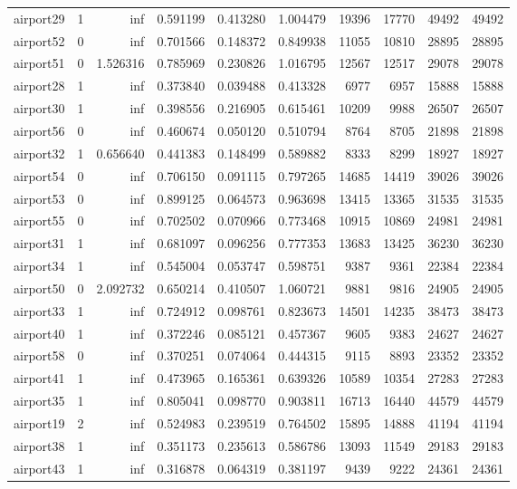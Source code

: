\begin{longtable}{|l|r|r|r|r|r|r|r|r|r|}
airport29 & 1 & inf & 0.591199 & 0.413280 & 1.004479 & 19396 & 17770 & 49492 & 49492 \\
airport52 & 0 & inf & 0.701566 & 0.148372 & 0.849938 & 11055 & 10810 & 28895 & 28895 \\
airport51 & 0 & 1.526316 & 0.785969 & 0.230826 & 1.016795 & 12567 & 12517 & 29078 & 29078 \\
airport28 & 1 & inf & 0.373840 & 0.039488 & 0.413328 & 6977 & 6957 & 15888 & 15888 \\
airport30 & 1 & inf & 0.398556 & 0.216905 & 0.615461 & 10209 & 9988 & 26507 & 26507 \\
airport56 & 0 & inf & 0.460674 & 0.050120 & 0.510794 & 8764 & 8705 & 21898 & 21898 \\
airport32 & 1 & 0.656640 & 0.441383 & 0.148499 & 0.589882 & 8333 & 8299 & 18927 & 18927 \\
airport54 & 0 & inf & 0.706150 & 0.091115 & 0.797265 & 14685 & 14419 & 39026 & 39026 \\
airport53 & 0 & inf & 0.899125 & 0.064573 & 0.963698 & 13415 & 13365 & 31535 & 31535 \\
airport55 & 0 & inf & 0.702502 & 0.070966 & 0.773468 & 10915 & 10869 & 24981 & 24981 \\
airport31 & 1 & inf & 0.681097 & 0.096256 & 0.777353 & 13683 & 13425 & 36230 & 36230 \\
airport34 & 1 & inf & 0.545004 & 0.053747 & 0.598751 & 9387 & 9361 & 22384 & 22384 \\
airport50 & 0 & 2.092732 & 0.650214 & 0.410507 & 1.060721 & 9881 & 9816 & 24905 & 24905 \\
airport33 & 1 & inf & 0.724912 & 0.098761 & 0.823673 & 14501 & 14235 & 38473 & 38473 \\
airport40 & 1 & inf & 0.372246 & 0.085121 & 0.457367 & 9605 & 9383 & 24627 & 24627 \\
airport58 & 0 & inf & 0.370251 & 0.074064 & 0.444315 & 9115 & 8893 & 23352 & 23352 \\
airport41 & 1 & inf & 0.473965 & 0.165361 & 0.639326 & 10589 & 10354 & 27283 & 27283 \\
airport35 & 1 & inf & 0.805041 & 0.098770 & 0.903811 & 16713 & 16440 & 44579 & 44579 \\
airport19 & 2 & inf & 0.524983 & 0.239519 & 0.764502 & 15895 & 14888 & 41194 & 41194 \\
airport38 & 1 & inf & 0.351173 & 0.235613 & 0.586786 & 13093 & 11549 & 29183 & 29183 \\
airport43 & 1 & inf & 0.316878 & 0.064319 & 0.381197 & 9439 & 9222 & 24361 & 24361 \\

\end{longtable}
